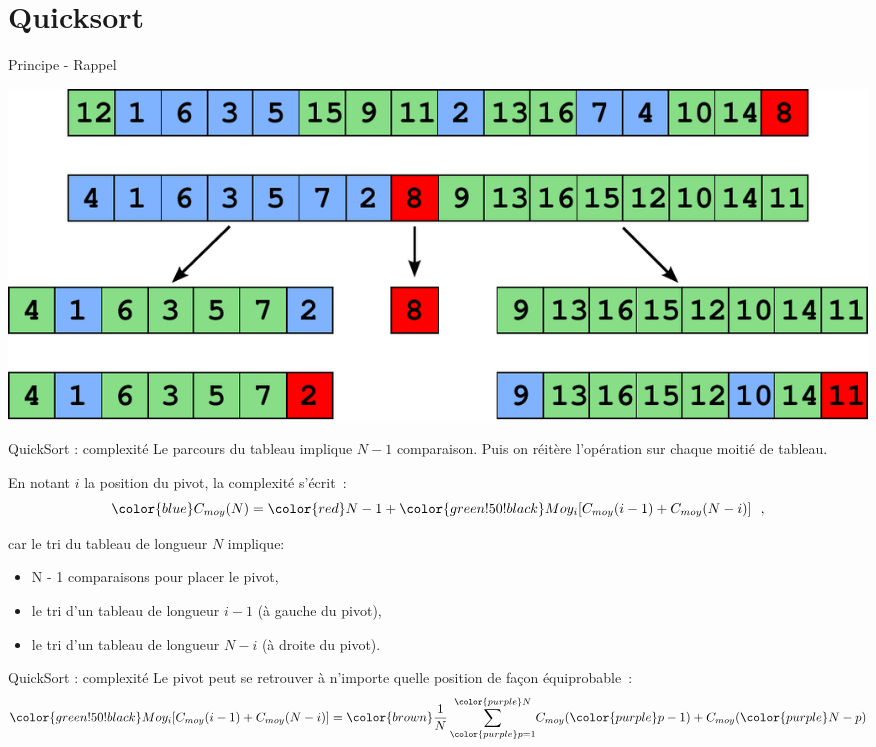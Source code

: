 \section{Quicksort}

\begin{frame}{Principe - Rappel}
\begin{center}
\includegraphics[width=\linewidth]{images/quicksort.pdf}
\end{center}
\end{frame}

\begin{frame}{QuickSort : complexité}
 Le parcours du tableau implique $N-1$ comparaison. Puis on réitère l'opération sur chaque moitié de tableau.
 
 En notant $i$ la position du pivot, la complexité s'écrit~:
 $$ {\color{blue} C_{moy}(N)} = {\color{red} N - 1} + {\color{green!50!black} Moy_i[C_{moy}(i-1) + C_{moy}(N-i)]}~~,$$
 
 car le tri du tableau de longueur $N$ implique:
 \begin{itemize}
  \item {\color{red} N - 1 comparaisons pour placer le pivot},
  \item {\color{green!50!black} le tri d'un tableau de longueur $i - 1$ (à gauche du pivot)},
  \item {\color{green!50!black} le tri d'un tableau de longueur $N - i$ (à droite du pivot)}.
 \end{itemize}
\end{frame}

\begin{frame}{QuickSort : complexité}
 Le pivot peut se retrouver à {\color{purple}n'importe quelle position} de {\color{brown}façon équiprobable}~:
 $$\color{green!50!black} Moy_i[C_{moy}(i-1) + C_{moy}(N-i)] = {\color{brown} \frac{1}{N} \sum_{{\color{purple} p=1}}^{{\color{purple} N}}}  C_{moy}({\color{purple} p-1}) + C_{moy}({\color{purple} N-p})$$
\end{frame}


